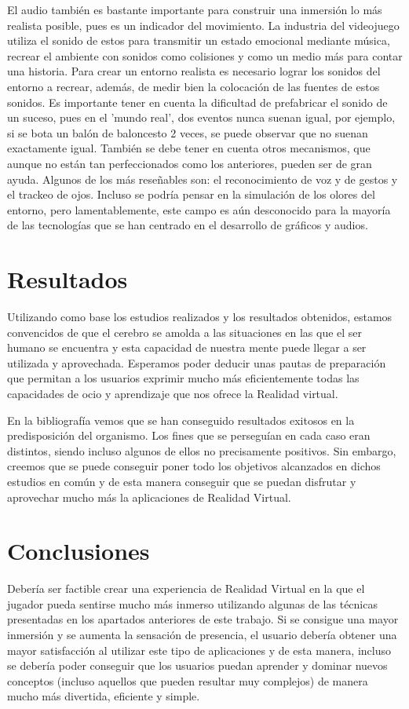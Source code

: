 \documentclass[twoside,twocolumn]{article}
\begin{document}
El audio también es bastante importante para construir una inmersión lo más realista posible, pues es un indicador del movimiento. La industria del videojuego utiliza el sonido de estos para transmitir un estado emocional mediante música, recrear el ambiente con sonidos como colisiones y como un medio más para contar una historia. Para crear un entorno realista es necesario lograr los sonidos del entorno a recrear, además, de medir bien la colocación de las fuentes de estos sonidos.  Es importante tener en cuenta la dificultad de prefabricar el sonido de un suceso, pues en el 'mundo real', dos eventos nunca suenan igual, por ejemplo, si se bota un balón de baloncesto 2 veces, se puede observar que no suenan exactamente igual.
También se debe tener en cuenta otros mecanismos, que aunque no están tan perfeccionados como los anteriores, pueden ser de gran ayuda. Algunos de los más reseñables son: el reconocimiento de voz y de gestos y el trackeo de ojos. Incluso se podría pensar en la simulación de los olores del entorno, pero lamentablemente, este campo es aún desconocido para la mayoría de las tecnologías que se han centrado en el desarrollo de gráficos y audios.


\section{Resultados}

Utilizando como base los estudios realizados y los resultados obtenidos, estamos convencidos de que el cerebro se amolda a las situaciones en las que el ser humano se encuentra y esta capacidad de nuestra mente puede llegar a ser utilizada y aprovechada. Esperamos poder deducir unas pautas de preparaci\'on que permitan a los usuarios exprimir mucho m\'as eficientemente todas las capacidades de ocio y aprendizaje que nos ofrece la Realidad virtual.

En la bibliograf\'i­a vemos que se han conseguido resultados exitosos en la predisposici\'on del organismo. Los fines que se persegu\'ian en cada caso eran distintos, siendo incluso algunos de ellos no precisamente positivos. Sin embargo, creemos que se puede conseguir poner todo los objetivos alcanzados en dichos estudios en com\'un y de esta manera conseguir que se puedan disfrutar y aprovechar mucho m\'as la aplicaciones de Realidad Virtual.


\section{Conclusiones}
Deber\'i­a ser factible crear una experiencia de Realidad Virtual en la que el jugador pueda sentirse mucho m\'as inmerso utilizando algunas de las t\'ecnicas presentadas en los apartados anteriores de este trabajo. Si se consigue una  mayor inmersi\'on y se aumenta la sensaci\'on de presencia, el usuario deber\'ia obtener una mayor satisfacci\'on al utilizar este tipo de aplicaciones y de esta manera, incluso se deber\'i­a poder conseguir que los usuarios puedan aprender y dominar nuevos conceptos (incluso aquellos que pueden resultar muy complejos) de manera mucho m\'as divertida, eficiente y simple.
\end{document}
